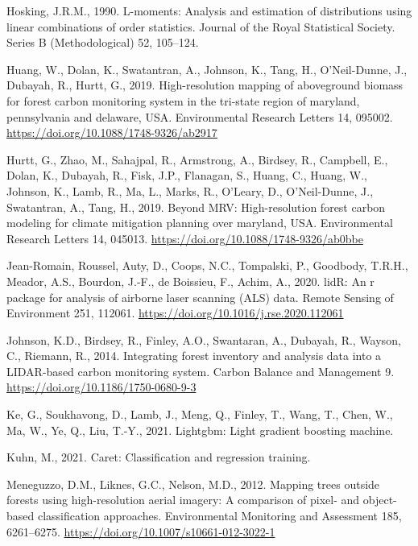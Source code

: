 \documentclass[]{elsarticle} %
\newlength{\cslhangindent}
\newenvironment{CSLReferences}[2] %
 {%
  \setlength{\parindent}{0pt}
  \ifodd #1 \everypar{\setlength{\hangindent}{\cslhangindent}}\ignorespaces\fi
  \ifnum #2 > 0
  \setlength{\parskip}{#2\baselineskip}
  \fi
 }%
 {}
\begin{document}
\begin{CSLReferences}{1}{0}
\leavevmode{}%
Hosking, J.R.M., 1990. L-moments: Analysis and estimation of distributions using linear combinations of order statistics. Journal of the Royal Statistical Society. Series B (Methodological) 52, 105--124.

\leavevmode{}%
Huang, W., Dolan, K., Swatantran, A., Johnson, K., Tang, H., O'Neil-Dunne, J., Dubayah, R., Hurtt, G., 2019. High-resolution mapping of aboveground biomass for forest carbon monitoring system in the tri-state region of maryland, pennsylvania and delaware, {USA}. Environmental Research Letters 14, 095002. \url{https://doi.org/10.1088/1748-9326/ab2917}

\leavevmode{}%
Hurtt, G., Zhao, M., Sahajpal, R., Armstrong, A., Birdsey, R., Campbell, E., Dolan, K., Dubayah, R., Fisk, J.P., Flanagan, S., Huang, C., Huang, W., Johnson, K., Lamb, R., Ma, L., Marks, R., O'Leary, D., O'Neil-Dunne, J., Swatantran, A., Tang, H., 2019. Beyond {MRV}: High-resolution forest carbon modeling for climate mitigation planning over maryland, {USA}. Environmental Research Letters 14, 045013. \url{https://doi.org/10.1088/1748-9326/ab0bbe}

\leavevmode{}%
Jean-Romain, Roussel, Auty, D., Coops, N.C., Tompalski, P., Goodbody, T.R.H., Meador, A.S., Bourdon, J.-F., de Boissieu, F., Achim, A., 2020. lidR: An r package for analysis of airborne laser scanning (ALS) data. Remote Sensing of Environment 251, 112061. \url{https://doi.org/10.1016/j.rse.2020.112061}

\leavevmode{}%
Johnson, K.D., Birdsey, R., Finley, A.O., Swantaran, A., Dubayah, R., Wayson, C., Riemann, R., 2014. Integrating forest inventory and analysis data into a {LIDAR}-based carbon monitoring system. Carbon Balance and Management 9. \url{https://doi.org/10.1186/1750-0680-9-3}

\leavevmode{}%
Ke, G., Soukhavong, D., Lamb, J., Meng, Q., Finley, T., Wang, T., Chen, W., Ma, W., Ye, Q., Liu, T.-Y., 2021. Lightgbm: Light gradient boosting machine.

\leavevmode{}%
Kuhn, M., 2021. Caret: Classification and regression training.

\leavevmode{}%
Meneguzzo, D.M., Liknes, G.C., Nelson, M.D., 2012. Mapping trees outside forests using high-resolution aerial imagery: A comparison of pixel- and object-based classification approaches. Environmental Monitoring and Assessment 185, 6261--6275. \url{https://doi.org/10.1007/s10661-012-3022-1}


\end{CSLReferences}
\end{document}
